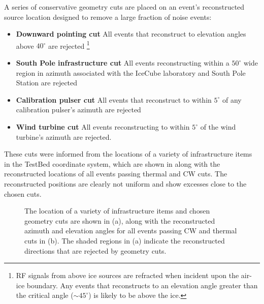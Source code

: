 A series of conservative geometry cuts are placed on an event's reconstructed source location designed to remove a large fraction of noise events:

\begin{itemize}

\item \textbf{Downward pointing cut} All events that reconstruct to elevation angles above $40^\circ$ are rejected \footnote{RF signals from above ice sources are refracted when incident upon the air-ice boundary. Any events that reconstructs to an elevation angle greater than the critical angle ($\sim 45^{\circ}$) is likely to be above the ice.}

\item \textbf{South Pole infrastructure cut} All events reconstructing within a $50^\circ$ wide region in azimuth associated with the IceCube laboratory and South Pole Station are rejected

\item \textbf{Calibration pulser cut} All events that reconstruct to within $5^\circ$ of any calibration pulser's azimuth are rejected

\item \textbf{Wind turbine cut} All events reconstructing to within $5^\circ$ of the wind turbine's azimuth are rejected.

\end{itemize}

These cuts were informed from the locations of a variety of infrastructure items in the TestBed coordinate system, which are shown in  along with the reconstructed locations of all events passing thermal and CW cuts. The reconstructed positions are clearly not uniform and show excesses close to the chosen cuts.

\begin{figure}[htpb]
  \hfill
  \caption{The location of a variety of infrastructure items and chosen geometry cuts are shown in (a), along with the reconstructed azimuth and elevation angles for all events passing CW and thermal cuts in (b). The shaded regions in (a) indicate the reconstructed directions that are rejected by geometry cuts.}
  \label{fig:Analysis:Anthropogenic-Cuts:Geometry-Cuts:VPol-Reco}
\end{figure}

